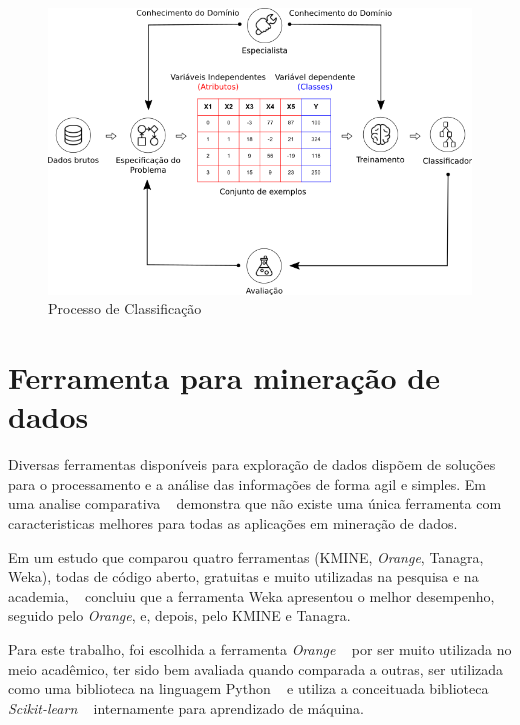 
\begin{figure}[H]
\begin{center}
    \includegraphics[scale=0.75]{figuras/processo_classificacao.png}
\end{center}
\caption{Processo de Classificação}
\label{fig:processo_classificacao}
\end{figure}


\section{Ferramenta para mineração de dados}

Diversas ferramentas disponíveis para exploração de dados dispõem de soluções para o processamento e a análise das informações de forma agil e simples. Em uma analise comparativa ~\cite{boscarioli2014avaliaccao} demonstra que não existe uma única ferramenta com caracteristicas melhores para todas as aplicações em mineração de dados.

Em um estudo que comparou quatro ferramentas (KMINE, \textit{Orange}, Tanagra, Weka), todas de código aberto, gratuitas e muito utilizadas na pesquisa e na academia, ~\cite{wahbeh2011comparison} concluiu que a ferramenta Weka apresentou o melhor desempenho, seguido pelo \textit{Orange}, e, depois, pelo KMINE e Tanagra.

Para este trabalho, foi escolhida a ferramenta \textit{Orange} ~\cite{JMLR:demsar13a} por ser muito utilizada no meio acadêmico, ter sido bem avaliada quando comparada a outras, ser utilizada como uma biblioteca na linguagem Python ~\cite{van2003python} e utiliza a conceituada biblioteca \textit{Scikit-learn} ~\cite{scikit-learn} internamente para aprendizado de máquina. 


